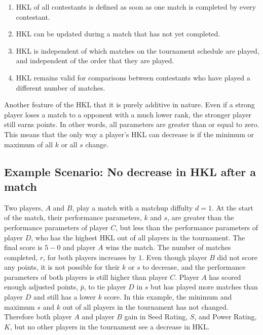 \documentclass[letterpaper, 10 pt, conference]{ieeeconf}  %
\begin{document}
\begin{enumerate}
        \item HKL of all contestants is defined as soon as one match is completed by every contestant.
        \item HKL can be updated during a match that has not yet completed.
        \item HKL is independent of which matches on the tournament schedule are played, and independent of the order that they are played.
        \item HKL remains valid for comparisons between contestants who have played a different number of matches.
\end{enumerate}

Another feature of the HKL that it is purely additive in nature.
Even if a strong player loses a match to a opponent with a much lower rank, the stronger player still earns points. 
In other words, all parameters are greater than or equal to zero.
This means that the only way a player's HKL can decrease is if the minimum or maximum of all $k$ or all $s$ change. 

\subsection{Example Scenario: No decrease in HKL after a match}
Two players, $A$ and $B$, play a match with a matchup diffulty $d=1$.
At the start of the match, their performance parameters, $k$ and $s$, are greater than the performance parameters of player $C$, but less than the performance parameters of player $D$, who has the highest HKL out of all players in the tournament.
The final score is $5-0$ and player $A$ wins the match.
The number of matches completed, $r$, for both players increases by $1$.
Even though player $B$ did not score any points, it is not possible for their $k$ or $s$ to decrease, and the performance parameters of both players is still higher than player $C$.
Player $A$ has scored enough adjusted points, $\bar{p}$, to tie player $D$ in $s$ but has played more matches than player $D$ and still has a lower $k$ score.
In this example, the minimum and maximum $s$ and $k$ out of all players in the tournament has not changed. 
Therefore both player $A$ and player $B$ gain in Seed Rating, $S$, and Power Rating, $K$, but no other players in the tournament see a decrease in HKL.

\end{document}
